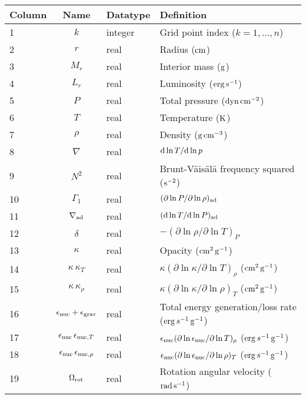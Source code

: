 \documentclass{article}
\newcommand{\diff}{\ensuremath{{\rm d}}}
\newcommand{\cm}{\ensuremath{{\rm cm}}}
\newcommand{\gram}{\ensuremath{{\rm g}}}
\newcommand{\second}{\ensuremath{{\rm s}}}
\newcommand{\dyne}{\ensuremath{{\rm dyn}}}
\newcommand{\erg}{\ensuremath{{\rm erg}}}
\newcommand{\kelvin}{\ensuremath{{\rm K}}}
\begin{document}
\begin{table}[h!]
\begin{tabular}{|l|c|l|l|} \hline
Column & Name & Datatype & Definition \\ \hline
1      & $k$ & integer & Grid point index ($k=1,\ldots,n$) \\
2      & $r$ & real    & Radius ($\cm$) \\
3      & $M_{r}$ & real  & Interior mass ($\gram$) \\
4      & $L_{r}$ & real & Luminosity ($\erg\,\second^{-1}$) \\
5      & $P$ & real    & Total pressure ($\dyne\,\cm^{-2}$) \\
6      & $T$ & real    & Temperature ($\kelvin$) \\
7      & $\rho$ & real & Density ($\gram\,\cm^{-3}$) \\
8      & $\nabla$ & real & $\diff \ln T/\diff \ln p$ \\
9      & $N^{2}$ & real & Brunt-V\"ais\"al\"a frequency squared ($\second^{-2}$) \\
10     & $\Gamma_{1}$ & real & $(\partial \ln P/\partial \ln \rho)_{\rm ad}$ \\
11     & $\nabla_{\rm ad}$ & real & $(\diff \ln T/\diff \ln P)_{\rm ad}$ \\
12     & $\delta$ & real & $-(\partial \ln \rho/\partial \ln T)_{P}$  \\
13     & $\kappa$ & real & Opacity ($\cm^{2}\,\gram^{-1}$) \\
14     & $\kappa\,\kappa_{T}$ & real & $\kappa (\partial \ln \kappa/\partial \ln T)_{\rho}$ ($\cm^{2}\,\gram^{-1}$) \\
15     & $\kappa\,\kappa_{\rho}$ & real & $\kappa (\partial \ln \kappa/\partial \ln \rho)_{T}$ ($\cm^{2}\,\gram^{-1}$) \\
16     & $\epsilon_{\rm nuc} + \epsilon_{\rm grav}$ & real & Total energy generation/loss rate ($\erg\,s^{-1}\,\gram^{-1}$) \\
17     & $\epsilon_{\rm nuc}\,\epsilon_{{\rm nuc},T}$ & real & $\epsilon_{\rm nuc} (\partial \ln \epsilon_{\rm nuc}/\partial \ln T)_{\rho}$ ($\erg\,s^{-1}\,\gram^{-1}$) \\
18     & $\epsilon_{\rm nuc}\,\epsilon_{{\rm nuc},\rho}$ & real & $\epsilon_{\rm nuc} (\partial \ln \epsilon_{\rm nuc}/\partial \ln \rho)_{T}$ ($\erg\,s^{-1}\,\gram^{-1}$) \\
19     & $\Omega_{\rm rot}$ & real & Rotation angular velocity (${\rm rad}\,\second^{-1}$) \\  \hline
\end{tabular}
\end{table}
\end{document}
